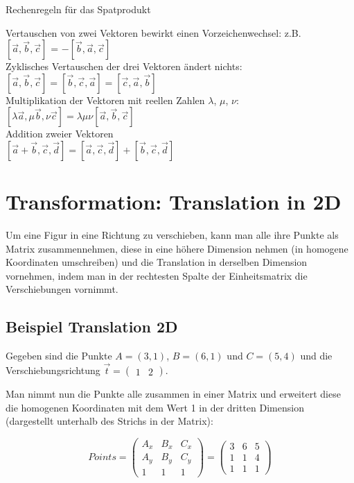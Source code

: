 \begin{description}
	\item[Rechenregeln für das Spatprodukt]
\end{description}
Vertauschen von zwei Vektoren bewirkt einen Vorzeichenwechsel: z.B.\\
$[\vec{a}, \vec{b}, \vec{c}]$ = $-[\vec{b}, \vec{a}, \vec{c}]$\\
Zyklisches Vertauschen der drei Vektoren ändert nichts:\\
$[\vec{a}, \vec{b}, \vec{c}] = [\vec{b}, \vec{c}, \vec{a}] = [\vec{c}, \vec{a}, \vec{b}]$\\
Multiplikation der Vektoren mit reellen Zahlen $\lambda$, $\mu$, $\nu$:\\
$[\lambda \vec{a}, \mu \vec{b}, \nu \vec{c}] = \lambda \mu \nu [\vec{a}, \vec{b}, \vec{c}]$\\
Addition zweier Vektoren\\
$[\vec{a} + \vec{b}, \vec{c}, \vec{d}] = [\vec{a}, \vec{c}, \vec{d}] + [\vec{b}, \vec{c}, \vec{d}]$

\section{Transformation: Translation in 2D}
Um eine Figur in eine Richtung zu verschieben, kann man alle ihre Punkte als Matrix zusammennehmen, diese in eine höhere Dimension nehmen (in homogene Koordinaten umschreiben) und die Translation in derselben Dimension vornehmen, indem man in der rechtesten Spalte der Einheitsmatrix die Verschiebungen vornimmt.

\subsection{Beispiel Translation 2D}

Gegeben sind die Punkte $A=(3,1)$, $B=(6,1)$ und $C=(5,4)$ und die Verschiebungsrichtung $\vec{t} = \begin{pmatrix}1 & 2
\end{pmatrix}$. 

Man nimmt nun die Punkte alle zusammen in einer Matrix und erweitert diese die homogenen Koordinaten mit dem Wert 1 in der dritten Dimension (dargestellt unterhalb des Strichs in der Matrix):

\[
Points = \begin{pmatrix}
A_x & B_x & C_x\\
A_y & B_y & C_y\\ \hline
1 & 1 & 1
\end{pmatrix} = \begin{pmatrix}
3 & 6 & 5\\
1 & 1 & 4\\ \hline
1 & 1 & 1
\end{pmatrix}
\]

